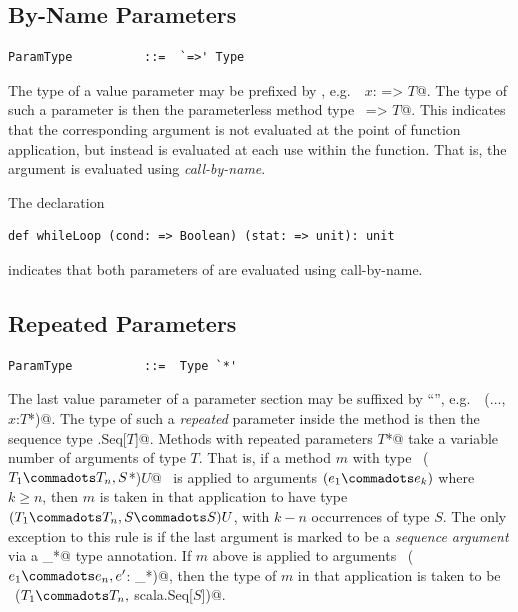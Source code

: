 \subsection{By-Name Parameters}\label{sec:by-name-params}

\syntax\begin{lstlisting} 
ParamType          ::=  `=>' Type
\end{lstlisting}

The type of a value parameter may be prefixed by \code{=>}, e.g.\
~\lstinline@$x$: => $T$@. The type of such a parameter is then the
parameterless method type ~\lstinline@=> $T$@. This indicates that the
corresponding argument is not evaluated at the point of function
application, but instead is evaluated at each use within the
function. That is, the argument is evaluated using {\em call-by-name}.

\example The declaration
\begin{lstlisting}
def whileLoop (cond: => Boolean) (stat: => unit): unit
\end{lstlisting}
indicates that both parameters of  are evaluated using
call-by-name.

\subsection{Repeated Parameters}\label{sec:repeated-params}

\syntax\begin{lstlisting} 
ParamType          ::=  Type `*'
\end{lstlisting}

The last value parameter of a parameter section may be suffixed by
``\code{*}'', e.g.\ ~\lstinline@(..., $x$:$T$*)@.  The type of such a
{\em repeated} parameter inside the method is then the sequence type
\lstinline@scala.Seq[$T$]@.  Methods with repeated parameters
\lstinline@$T$*@ take a variable number of arguments of type $T$.
That is, if a method $m$ with type ~\lstinline@($T_1 \commadots T_n,
S$*)$U$@~ is applied to arguments $(e_1 \commadots e_k)$ where $k \geq
n$, then $m$ is taken in that application to have type $(T_1
\commadots T_n, S \commadots S)U$, with $k - n$ occurrences of type
$S$.  The only exception to this rule is if the last argument is
marked to be a {\em sequence argument} via a \lstinline@_*@ type
annotation. If $m$ above is applied to arguments
~\lstinline@($e_1 \commadots e_n, e'$: _*)@, then the type of $m$ in
that application is taken to be 
~\lstinline@($T_1\commadots T_n,$ scala.Seq[$S$])@.

